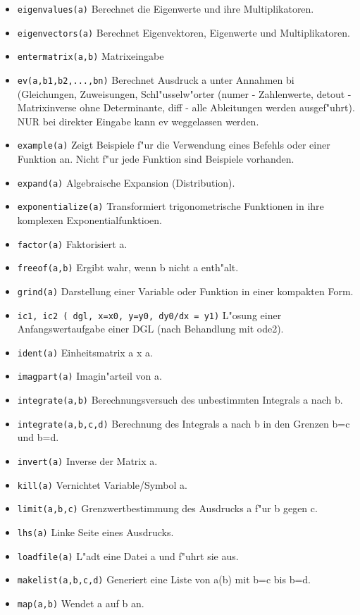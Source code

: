 \documentclass[spanish,12pt,a4paper]{article}
\begin{document}
\begin{itemize}
\item \verb|eigenvalues(a)| Berechnet die Eigenwerte und ihre Multiplikatoren.
\item \verb|eigenvectors(a)| Berechnet Eigenvektoren, Eigenwerte und Multiplikatoren.
\item \verb|entermatrix(a,b)| Matrixeingabe
\item \verb|ev(a,b1,b2,...,bn)| Berechnet Ausdruck a unter Annahmen bi (Gleichungen, Zuweisungen, Schl"usselw"orter (numer - Zahlenwerte, detout - Matrixinverse ohne Determinante, diff - alle Ableitungen werden ausgef"uhrt). NUR bei direkter Eingabe kann ev weggelassen werden.
\item \verb|example(a)| Zeigt Beispiele f"ur die Verwendung eines Befehls oder einer Funktion an. Nicht f"ur jede Funktion sind Beispiele vorhanden.
\item \verb|expand(a)| Algebraische Expansion (Distribution).
\item \verb|exponentialize(a)| Transformiert trigonometrische Funktionen in ihre komplexen Exponentialfunktioen.
\item \verb|factor(a)| Faktorisiert a.
\item \verb|freeof(a,b)| Ergibt wahr, wenn b nicht a enth"alt.
\item \verb|grind(a)| Darstellung einer Variable oder Funktion in einer kompakten Form.
\item \verb|ic1, ic2 ( dgl, x=x0, y=y0, dy0/dx = y1)| L"osung einer Anfangswertaufgabe einer DGL (nach Behandlung mit ode2).
\item \verb|ident(a)| Einheitsmatrix a x a.
\item \verb|imagpart(a)| Imagin"arteil von a.
\item \verb|integrate(a,b)| Berechnungsversuch des unbestimmten Integrals a nach b.
\item \verb|integrate(a,b,c,d)| Berechnung des Integrals a nach b in den Grenzen b=c und b=d.
\item \verb|invert(a)| Inverse der Matrix a.
\item \verb|kill(a)| Vernichtet Variable/Symbol a.
\item \verb|limit(a,b,c)| Grenzwertbestimmung des Ausdrucks a f"ur b gegen c.
\item \verb|lhs(a)| Linke Seite eines Ausdrucks.
\item \verb|loadfile(a)| L"adt eine Datei a und f"uhrt sie aus.
\item \verb|makelist(a,b,c,d)| Generiert eine Liste von a(b) mit b=c bis b=d.
\item \verb|map(a,b)| Wendet a auf b an.

\end{itemize}
\end{document}
